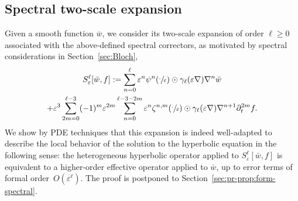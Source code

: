 \documentclass[10pt]{amsart}
\theoremstyle{plain}
\theoremstyle{definition}
\numberwithin{equation}{section}
\newcommand{\e}{\varepsilon}
\begin{document}
\subsection{Spectral two-scale expansion}
Given a smooth function $\bar w$, we consider its two-scale expansion of order $\ell\ge 0$ associated with the above-defined spectral correctors, as motivated by spectral considerations in Section~\ref{sec:Bloch},
\begin{multline}\label{eq:2s-spec}
S_\e^\ell[\bar w,f]:=\sum_{n=0}^\ell \e^n \psi^n(\sfrac\cdot\e)\odot \gamma_{\ell}(\e\nabla)\nabla^n\bar w\\
+\e^3 \sum_{2m=0}^{\ell-3}(-1)^m\e^{2m} \sum_{n=0}^{\ell-3-2m} \e^n \zeta^{n,m}(\sfrac\cdot\e)\odot \gamma_{\ell} (\e \nabla) \nabla^{n+1}\partial_t^{2m} f.
\end{multline}
We show by PDE techniques that this expansion is indeed well-adapted to describe the local behavior of the solution to the hyperbolic equation in the following sense: the heterogeneous hyperbolic operator applied to $S^\ell_\e[\bar w,f]$ is equivalent to a higher-order effective operator applied to $\bar w$, up to error terms of formal order~$O(\e^\ell)$. The proof is postponed to Section~\ref{sec:pr-prop:form-spectral}.
\end{document}

